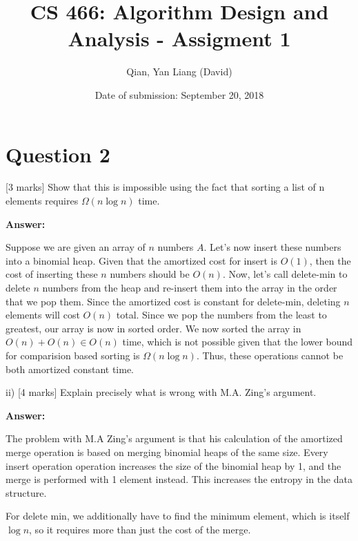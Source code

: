 \documentclass{article}
\title{CS 466: Algorithm Design and Analysis - Assigment 1}
\author{Qian, Yan Liang (David)}
\date{Date of submission: September 20, 2018}
\begin{document}
\newpage

\section{Question 2}


[3 marks] Show that this is impossible using the fact that sorting a list of n elements requires $\Omega (n \log n)$
time.

\textbf{Answer:}

Suppose we are given an array of $n$ numbers $A$. Let's now insert these numbers into a binomial heap. Given that the
amortized cost for insert is $O(1)$, then the cost of inserting these $n$ numbers should be $O(n)$. Now, let's
call delete-min to delete $n$ numbers from the heap and re-insert them into the array in the order that we pop them.
Since the amortized cost is constant for delete-min, deleting $n$ elements will cost $O(n)$ total. Since we pop the
numbers from the least to greatest, our array is now in sorted order. We now sorted the array in $O(n) + O(n) \in O(n)$
time, which is not possible given that the lower bound for comparision based sorting is $\Omega (n \log n)$. Thus, these
operations cannot be both amortized constant time.


ii) [4 marks] Explain precisely what is wrong with M.A. Zing’s argument.

\textbf{Answer:}

The problem with M.A Zing's argument is that his calculation of the amortized merge operation is based on merging
binomial heaps of the same size. Every insert operation operation increases the size of the binomial heap by 1, and the
merge is performed with 1 element instead. This increases the entropy in the data structure.

For delete min, we additionally have to find the minimum element, which is itself $\log n$, so it requires more than
just the cost of the merge.
\end{document}
